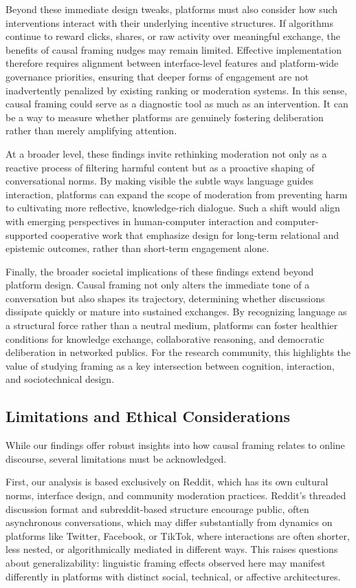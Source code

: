 \documentclass[acmsmall]{acmart}
\begin{document}
Beyond these immediate design tweaks, platforms must also consider how such interventions interact with their underlying incentive structures. If algorithms continue to reward clicks, shares, or raw activity over meaningful exchange, the benefits of causal framing nudges may remain limited. Effective implementation therefore requires alignment between interface-level features and platform-wide governance priorities, ensuring that deeper forms of engagement are not inadvertently penalized by existing ranking or moderation systems. In this sense, causal framing could serve as a diagnostic tool as much as an intervention. It can be a way to measure whether platforms are genuinely fostering deliberation rather than merely amplifying attention.

At a broader level, these findings invite rethinking moderation not only as a reactive process of filtering harmful content but as a proactive shaping of conversational norms. By making visible the subtle ways language guides interaction, platforms can expand the scope of moderation from preventing harm to cultivating more reflective, knowledge-rich dialogue. Such a shift would align with emerging perspectives in human-computer interaction and computer-supported cooperative work that emphasize design for long-term relational and epistemic outcomes, rather than short-term engagement alone.

Finally, the broader societal implications of these findings extend beyond platform design. Causal framing not only alters the immediate tone of a conversation but also shapes its trajectory, determining whether discussions dissipate quickly or mature into sustained exchanges. By recognizing language as a structural force rather than a neutral medium, platforms can foster healthier conditions for knowledge exchange, collaborative reasoning, and democratic deliberation in networked publics. For the research community, this highlights the value of studying framing as a key intersection between cognition, interaction, and sociotechnical design.




\subsection{Limitations and Ethical Considerations}

While our findings offer robust insights into how causal framing relates to online discourse, several limitations must be acknowledged.

First, our analysis is based exclusively on Reddit, which has its own cultural norms, interface design, and community moderation practices. Reddit’s threaded discussion format and subreddit-based structure encourage public, often asynchronous conversations, which may differ substantially from dynamics on platforms like Twitter, Facebook, or TikTok, where interactions are often shorter, less nested, or algorithmically mediated in different ways. This raises questions about generalizability: linguistic framing effects observed here may manifest differently in platforms with distinct social, technical, or affective architectures.
\end{document}
